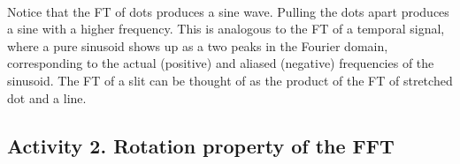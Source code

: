 \documentclass[11pt]{article}
\begin{document}
    \begin{center}
    \end{center}
    { \hspace*{\fill} \\}
    
    Notice that the FT of dots produces a sine wave. Pulling the dots apart
produces a sine with a higher frequency. This is analogous to the FT of
a temporal signal, where a pure sinusoid shows up as a two peaks in the
Fourier domain, corresponding to the actual (positive) and aliased
(negative) frequencies of the sinusoid. The FT of a slit can be thought
of as the product of the FT of stretched dot and a line.

    \hypertarget{activity-2.-rotation-property-of-the-fft}{%
\subsection{Activity 2. Rotation property of the
FFT}\label{activity-2.-rotation-property-of-the-fft}}
\end{document}
